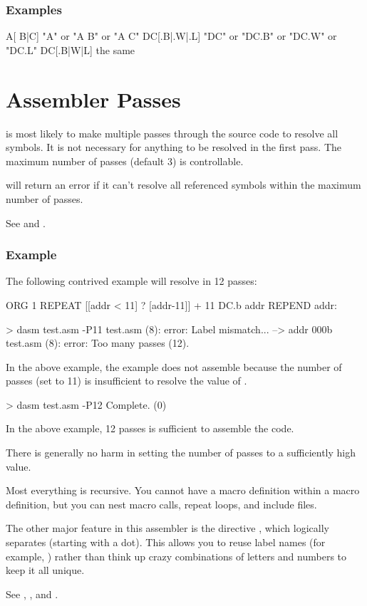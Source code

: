 \subsubsection{Examples}
\begin{code}
A[ {B|C}]       "A" or "A B" or "A C"
DC[{.B|.W|.L}]  "DC" or "DC.B" or "DC.W" or "DC.L"
DC[.{B|W|L}]    the same
\end{code} 
 
\section{Assembler Passes}
 
\dasm is most likely to make multiple passes through the source code to resolve all symbols. It is not necessary for anything to be resolved in the first pass. The maximum number of passes (default 3) is controllable.

\dasm will return an error if it can't resolve all referenced symbols within the maximum number of passes.
 
 See   and .

\subsubsection{Example}
 
 The following contrived example will resolve in 12 passes:
 
 \begin{code}
   ORG 1
   REPEAT [[addr < 11] ? [addr-11]] + 11
     DC.b addr
   REPEND
 addr:
 \end{code}
 
 \begin{outputx}
 > dasm test.asm -P11
test.asm (8): error: Label mismatch...
 --> addr 000b                  
test.asm (8): error: Too many passes (12).
\end{outputx}
  
In the above example, the example does not assemble because the number of passes (set to 11) is insufficient to resolve the value of .  
    
 \begin{outputx}
 > dasm test.asm -P12
 Complete. (0)
\end{outputx} 
 
 In the above example, 12 passes is sufficient to assemble the code.
 
 There is generally no harm in setting the number of passes to a sufficiently high value.
 
 
 Most everything is recursive.  You cannot have a macro definition
 within a macro definition, but you can nest macro calls, repeat loops,
 and include files.
 
 The other major feature in this assembler is the  directive , which logically separates  (starting with a dot).  This
 allows you to reuse label names (for example, ) rather than
 think up crazy combinations of letters and numbers to keep it all unique.
 
 See , , and .
 
 